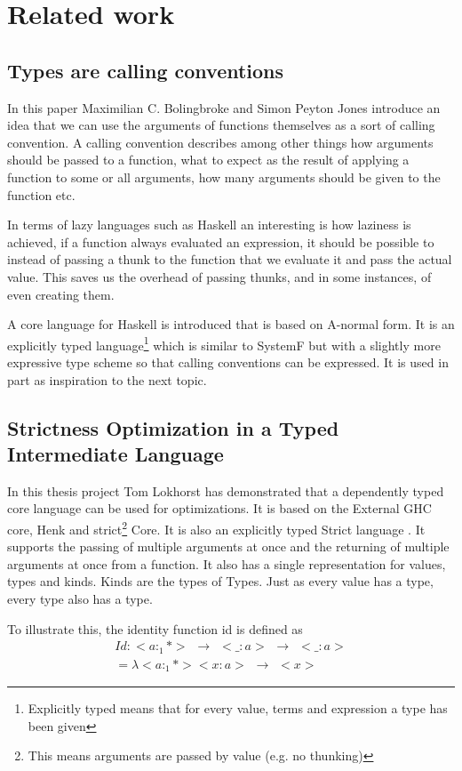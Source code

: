 \documentclass[11pt,twoside,a4paper]{article}
\begin{document}
\section{Related work}
\subsection{Types are calling conventions\cite{types}}
In this paper Maximilian C. Bolingbroke and Simon Peyton Jones introduce an idea that we can use the arguments of functions themselves as a sort of calling convention. A calling convention describes among other things how arguments should be passed to a function, what to expect as the result of applying a function to some or all arguments, how many arguments should be given to the function etc.

In terms of lazy languages such as Haskell an interesting is how laziness is achieved, if a function always evaluated an expression, it should be possible to instead of passing a thunk to the function that we evaluate it and pass the actual value. This saves us the overhead of passing thunks, and in some instances, of even creating them.

A core language for Haskell is introduced that is based on A-normal form. It is an explicitly typed language\footnote{Explicitly typed means that for every value, terms and expression a type has been given} which is similar to SystemF but with a slightly more expressive type scheme so that calling conventions can be expressed. It is used in part as inspiration to the next topic.

\subsection{Strictness Optimization in a Typed Intermediate Language\cite{Tom}}
In this thesis project Tom Lokhorst has demonstrated that a dependently typed core language can be used for optimizations. It is based on the External GHC core, Henk and strict\footnote{This means arguments are passed by value (e.g. no thunking)} Core.  It is also an explicitly typed Strict language . It supports the passing of multiple arguments at once and the returning of multiple arguments at once from a function. It also has a single representation for values, types and kinds. Kinds are the types of Types. Just as every value has a type, every type also has a type.

To illustrate this, the identity function id is defined as
\begin{align*}
Id : <a:_1*> \hspace{5pt} \rightarrow  \hspace{5pt}  <\_:a> \hspace{5pt} \rightarrow \hspace{5pt} <\_:a> \\
 = \lambda<a:_1*> <x:a> \hspace{5pt} \rightarrow \hspace{5pt} <x>
\end{align*}
\end{document}
